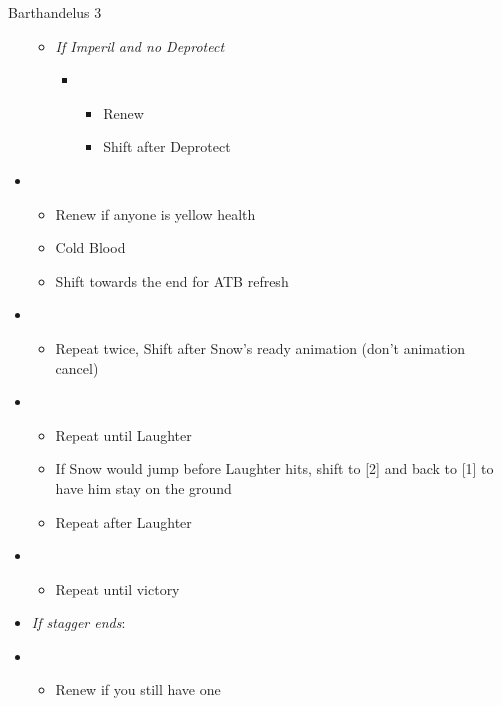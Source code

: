 \begin{battle}[1:26]{Barthandelus 3}
\begin{itemize}
\begin{itemize}
\begin{itemize}
\begin{itemize}
					                  \end{itemize}
				            \end{itemize}
				      \item \textit{If Imperil and no Deprotect}
				            \begin{itemize}
					            \item \fifth
					                  \begin{itemize}
						                  \item Renew
						                  \item Shift after Deprotect
					                  \end{itemize}
				            \end{itemize}
			      \end{itemize}
			\item \sixth
			      \begin{itemize}
				      \item Renew if anyone is yellow health
				      \item Cold Blood
				      \item Shift towards the end for ATB refresh
			      \end{itemize}
			\item \second
			      \begin{itemize}
				      \item Repeat twice, Shift after Snow's ready animation (don't animation cancel)
			      \end{itemize}
			\item \fourth
			      \begin{itemize}
				      \item Repeat until Laughter
				      \item If Snow would jump before Laughter hits, shift to [2] and back to [1] to have him stay on the ground
				      \item Repeat after Laughter
			      \end{itemize}
			\item \second
			      \begin{itemize}
				      \item Repeat until victory
			      \end{itemize}
			\item \textit{If stagger ends}:
			\item \third
			      \begin{itemize}
				      \item Renew if you still have one

\end{itemize}
\end{itemize}
\end{battle}

